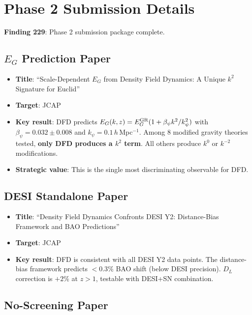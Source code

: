 \documentclass[11pt,a4paper]{article}
\begin{document}
\section{Phase 2 Submission Details}

\textbf{Finding 229}: Phase 2 submission package complete.

\subsection{$E_G$ Prediction Paper}

\begin{itemize}[nosep]
\item \textbf{Title}: ``Scale-Dependent $E_G$ from Density Field Dynamics: A Unique $k^2$ Signature for Euclid''
\item \textbf{Target}: JCAP
\item \textbf{Key result}: DFD predicts $E_G(k,z) = E_G^{\rm GR}(1 + \beta_\psi k^2 / k_\psi^2)$ with $\beta_\psi = 0.032 \pm 0.008$ and $k_\psi = 0.1\,h\,$Mpc$^{-1}$. Among 8 modified gravity theories tested, \textbf{only DFD produces a $k^2$ term}. All others produce $k^0$ or $k^{-2}$ modifications.
\item \textbf{Strategic value}: This is the single most discriminating observable for DFD.
\end{itemize}

\subsection{DESI Standalone Paper}

\begin{itemize}[nosep]
\item \textbf{Title}: ``Density Field Dynamics Confronts DESI Y2: Distance-Bias Framework and BAO Predictions''
\item \textbf{Target}: JCAP
\item \textbf{Key result}: DFD is consistent with all DESI Y2 data points. The distance-bias framework predicts $< 0.3\%$ BAO shift (below DESI precision). $D_L$ correction is $+2\%$ at $z > 1$, testable with DESI+SN combination.
\end{itemize}

\subsection{No-Screening Paper}
\end{document}
